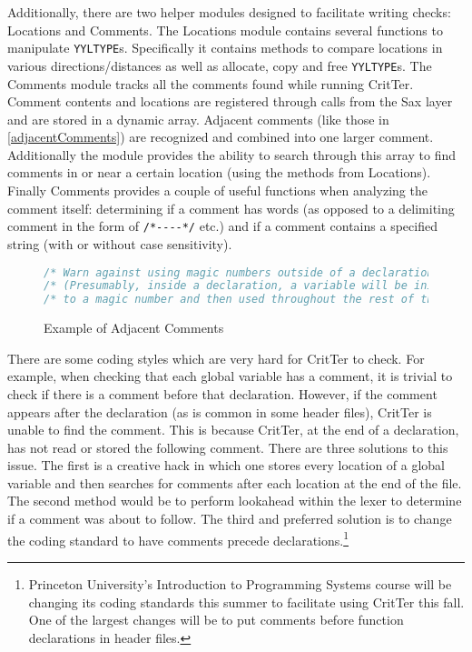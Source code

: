 \documentclass[12pt]{report}
\newcommand{\programName}{CritTer\xspace}
\begin{document}
Additionally, there are two helper modules designed to facilitate writing checks: Locations and 
Comments. The Locations module contains several functions to manipulate \lstinline{YYLTYPE}s.  
Specifically it contains methods to compare locations in various directions\slash distances as well as 
allocate, copy and free \lstinline{YYLTYPE}s. The Comments module tracks all the comments found 
while running \programName. Comment contents and locations are registered through calls from the 
Sax layer and are stored in a dynamic array. Adjacent comments (like those in 
\autoref{adjacentComments}) are recognized and combined into one larger comment. Additionally the 
module provides the ability to search through this array to find comments in or near a certain location 
(using the methods from Locations). Finally Comments provides a couple of useful functions when 
analyzing the comment itself: determining if a comment has words (as opposed to a delimiting comment 
in the form of \lstinline{/*----*/} etc.) and if a comment contains a specified string (with or without case 
sensitivity).

\begin{figure}
\begin{lstlisting}[language=C]
/* Warn against using magic numbers outside of a declaration.        */
/* (Presumably, inside a declaration, a variable will be initialized */
/* to a magic number and then used throughout the rest of the code). */
\end{lstlisting}
\caption{Example of Adjacent Comments}
\label{adjacentComments}
\end{figure}

There are some coding styles which are very hard for \programName to check. For example, when 
checking that each global variable has a comment, it is trivial to check if there is a comment before that 
declaration. However, if the comment appears after the declaration (as is common in some header 
files), \programName is unable to find the comment. This is because \programName, at the end of a 
declaration, has not read or stored the following comment. There are three solutions to this issue. The 
first is a creative hack in which one stores every location of a global variable and then searches for 
comments after each location at the end of the file. The second method would be to perform lookahead 
within the lexer to determine if a comment was about to follow. The third and preferred solution is to 
change the coding standard to have comments precede declarations.\footnote{Princeton University's 
Introduction to Programming Systems course\cite{cos217} will be changing its coding standards this 
summer to facilitate using \programName this fall. One of the largest changes will be to put comments 
before function declarations in header files.}
\end{document}
